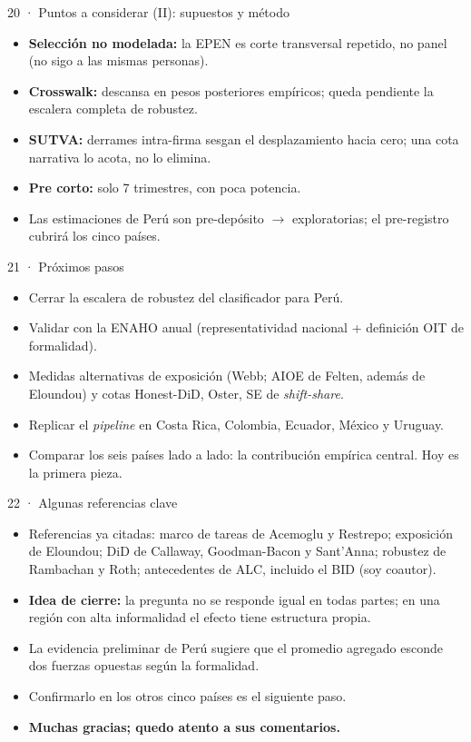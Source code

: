 \documentclass[11pt,aspectratio=169]{beamer}
\begin{document}
\begin{frame}{20 · Puntos a considerar (II): supuestos y método}
\begin{itemize}
  \item \textbf{Selección no modelada:} la EPEN es corte transversal repetido, no panel (no sigo a las mismas personas).
  \item \textbf{Crosswalk:} descansa en pesos posteriores empíricos; queda pendiente la escalera completa de robustez.
  \item \textbf{SUTVA:} derrames intra-firma sesgan el desplazamiento hacia cero; una cota narrativa lo acota, no lo elimina.
  \item \textbf{Pre corto:} solo 7 trimestres, con poca potencia.
  \item Las estimaciones de Perú son pre-depósito $\to$ exploratorias; el pre-registro cubrirá los cinco países.
\end{itemize}
\end{frame}

\begin{frame}{21 · Próximos pasos}
\begin{itemize}
  \item Cerrar la escalera de robustez del clasificador para Perú.
  \item Validar con la ENAHO anual (representatividad nacional + definición OIT de formalidad).
  \item Medidas alternativas de exposición (Webb; AIOE de Felten, además de Eloundou) y cotas Honest-DiD, Oster, SE de \emph{shift-share}.
  \item Replicar el \emph{pipeline} en Costa Rica, Colombia, Ecuador, México y Uruguay.
  \item Comparar los seis países lado a lado: la contribución empírica central. Hoy es la primera pieza.
\end{itemize}
\end{frame}

\begin{frame}{22 · Algunas referencias clave}
\begin{itemize}
  \item Referencias ya citadas: marco de tareas de Acemoglu y Restrepo; exposición de Eloundou; DiD de Callaway, Goodman-Bacon y Sant'Anna; robustez de Rambachan y Roth; antecedentes de ALC, incluido el BID (soy coautor).
  \item \textbf{Idea de cierre:} la pregunta no se responde igual en todas partes; en una región con alta informalidad el efecto tiene estructura propia.
  \item La evidencia preliminar de Perú sugiere que el promedio agregado esconde dos fuerzas opuestas según la formalidad.
  \item Confirmarlo en los otros cinco países es el siguiente paso.
  \item \textbf{Muchas gracias; quedo atento a sus comentarios.}
\end{itemize}
\end{frame}
\end{document}
